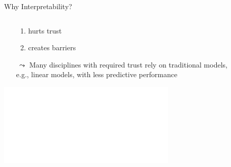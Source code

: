\documentclass[11pt,compress,t,notes=noshow, aspectratio=169, xcolor=table]{beamer}
\begin{document}
\begin{frame}{Why Interpretability?}
\begin{columns}[T, totalwidth=\textwidth]
\begin{column}{0.8\textwidth}
\begin{itemize}
			\begin{enumerate}
				\item hurts trust
				\item creates barriers
			\end{enumerate}
			\item[\,$\leadsto$] Many disciplines with required trust rely on traditional models,\\ e.g., linear models, with less predictive performance   
		\end{itemize}
    \centering\includegraphics<2->[width=0.7\textwidth]{figure/performance_vs_interpretability.pdf}
	\end{column}
	\begin{column}{0.2\textwidth}  %
        \centering

\end{column}
\end{columns}
\end{frame}
\end{document}
